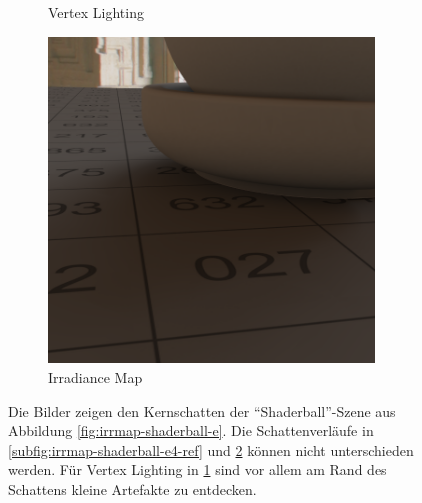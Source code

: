 \begin{figure}[h]
\begin{subfigure}[t]{0.33\textwidth}
				\caption{Vertex Lighting}
				\label{subfig:irrmap-shaderball-e4-vmap}
			\end{subfigure}
			\begin{subfigure}[t]{0.33\textwidth}
				\center
				\includegraphics[width=0.95\textwidth]{pic/irrmap-shaderball_e4-irrmap.png}
				\caption{Irradiance Map}
				\label{subfig:irrmap-shaderball-e4-irrmap}
			\end{subfigure}
			\caption[Irradiance-Map der \enquote{Shaderball}-Szene mit der \enquote{Ennis-Brown House}-HDR in den Löchern]{Die Bilder zeigen den Kernschatten der \enquote{Shaderball}-Szene aus Abbildung \ref{fig:irrmap-shaderball-e}. Die Schattenverläufe in \ref{subfig:irrmap-shaderball-e4-ref} und \ref{subfig:irrmap-shaderball-e4-irrmap} können nicht unterschieden werden. Für Vertex Lighting in \ref{subfig:irrmap-shaderball-e4-vmap} sind vor allem am Rand des Schattens kleine Artefakte zu entdecken.}
			\label{fig:irrmap-shaderball-e4}
		\end{figure}

